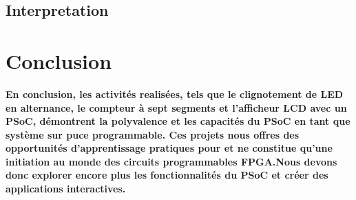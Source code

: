   
 \subsection{Interpretation}
 \label{sec:Interpretation}


\section{Conclusion}
\label{chap:conclusion}

\textbf{En conclusion, les activités realisées, tels que le clignotement de LED
 en alternance, le compteur à sept segments et l'afficheur LCD avec un PSoC, 
 démontrent la polyvalence et les capacités du PSoC en tant que système sur puce
  programmable. Ces projets nous offres des opportunités d'apprentissage pratiques pour
et ne constitue qu'une initiation au monde des circuits programmables FPGA.Nous devons donc explorer encore plus les fonctionnalités du PSoC et 
   créer des applications interactives.}
